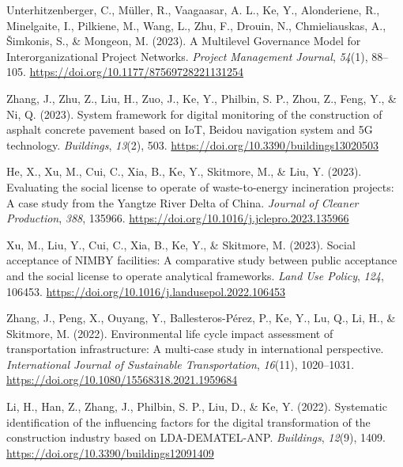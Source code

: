 \documentclass[11pt,a4paper]{report} %
\begin{document}
\begin{tablist}
        \item[2023] \tab{}Unterhitzenberger, C., Müller, R., Vaagaasar, A. L., Ke, Y., Alonderiene, R., Minelgaite, I., Pilkiene, M., Wang, L., Zhu, F., Drouin, N., Chmieliauskas, A., Šimkonis, S., \& Mongeon, M. (2023). A Multilevel Governance Model for Interorganizational Project Networks. \textit{Project Management Journal}, \textit{54}(1), 88--105. \href{https://doi.org/10.1177/87569728221131254}{https://doi.org/10.1177/87569728221131254}
        
        \item[2023] \tab{}Zhang, J., Zhu, Z., Liu, H., Zuo, J., Ke, Y., Philbin, S. P., Zhou, Z., Feng, Y., \& Ni, Q. (2023). System framework for digital monitoring of the construction of asphalt concrete pavement based on IoT, Beidou navigation system and 5G technology. \textit{Buildings}, \textit{13}(2), 503. \href{https://doi.org/10.3390/buildings13020503}{https://doi.org/10.3390/buildings13020503}
        
        \item[2023] \tab{}He, X., Xu, M., Cui, C., Xia, B., Ke, Y., Skitmore, M., \& Liu, Y. (2023). Evaluating the social license to operate of waste-to-energy incineration projects: A case study from the Yangtze River Delta of China. \textit{Journal of Cleaner Production}, \textit{388}, 135966. \href{https://doi.org/10.1016/j.jclepro.2023.135966}{https://doi.org/10.1016/j.jclepro.2023.135966}
        
        \item[2023] \tab{}Xu, M., Liu, Y., Cui, C., Xia, B., Ke, Y., \& Skitmore, M. (2023). Social acceptance of NIMBY facilities: A comparative study between public acceptance and the social license to operate analytical frameworks. \textit{Land Use Policy}, \textit{124}, 106453. \href{https://doi.org/10.1016/j.landusepol.2022.106453}{https://doi.org/10.1016/j.landusepol.2022.106453}
        
        \item[2022] \tab{}Zhang, J., Peng, X., Ouyang, Y., Ballesteros-Pérez, P., Ke, Y., Lu, Q., Li, H., \& Skitmore, M. (2022). Environmental life cycle impact assessment of transportation infrastructure: A multi-case study in international perspective. \textit{International Journal of Sustainable Transportation}, \textit{16}(11), 1020--1031. \href{https://doi.org/10.1080/15568318.2021.1959684}{https://doi.org/10.1080/15568318.2021.1959684}
        
        \item[2022] \tab{}Li, H., Han, Z., Zhang, J., Philbin, S. P., Liu, D., \& Ke, Y. (2022). Systematic identification of the influencing factors for the digital transformation of the construction industry based on LDA-DEMATEL-ANP. \textit{Buildings}, \textit{12}(9), 1409. \href{https://doi.org/10.3390/buildings12091409}{https://doi.org/10.3390/buildings12091409}
        

\end{tablist}
\end{document}
